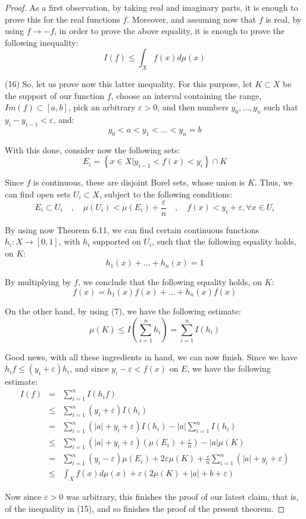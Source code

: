 \documentclass[10pt,a4paper]{amsart}
\begin{document}
\begin{proof}
As a first observation, by taking real and imaginary parts, it is enough to prove this for the real functions $f$. Moreover, and assuming now that $f$ is real, by using $f\to-f$, in order to prove the above equality, it is enough to prove the following inequality:
$$I(f)\leq\int_Xf(x)d\mu(x)$$

(16) So, let us prove now this latter inequality. For this purpose, let $K\subset X$ be the support of our function $f$, choose an interval containing the range, $Im(f)\subset[a,b]$, pick an arbitrary $\varepsilon>0$, and then numbers $y_0,\ldots,y_n$ such that $y_i-y_{i-1}<\varepsilon$, and:
$$y_0<a<y_1<\ldots<y_n=b$$

With this done, consider now the following sets:
$$E_i=\left\{x\in X\Big|y_{i-1}<f(x)<y_i\right\}\cap K$$

Since $f$ is continuous, these are disjoint Borel sets, whose union is $K$. Thus, we can find open sets $U_i\subset X$, subject to the following conditions:
$$E_i\subset U_i\quad,\quad \mu(U_i)<\mu(E_i)+\frac{\varepsilon}{n}\quad,\quad f(x)<y_i+\varepsilon,\forall x\in U_i$$

By using now Theorem 6.11, we can find certain continuous functions $h_i:X\to[0,1]$, with $h_i$ supported on $U_i$, such that the following equality holds, on $K$:
$$h_1(x)+\ldots+h_n(x)=1$$

By multiplying by $f$, we conclude that the following equality holds, on $K$:
$$f(x)=h_1(x)f(x)+\ldots+h_n(x)f(x)$$

On the other hand, by using (7), we have the following estimate:
$$\mu(K)\leq I\left(\sum_{i=1}^nh_i\right)=\sum_{i=1}^nI(h_i)$$

Good news, with all these ingredients in hand, we can now finish. Since we have $h_if\leq(y_i+\varepsilon)h_i$, and since $y_i-\varepsilon<f(x)$ on $E$, we have the following estimate:
\begin{eqnarray*}
I(f)
&=&\sum_{i=1}^nI(h_if)\\
&\leq&\sum_{i=1}^n(y_i+\varepsilon)I(h_i)\\
&=&\sum_{i=1}^n(|a|+y_i+\varepsilon)I(h_i)-|a|\sum_{i=1}^nI(h_i)\\
&\leq&\sum_{i=1}^n(|a|+y_i+\varepsilon)\left(\mu(E_i)+\frac{\varepsilon}{n}\right)-|a|\mu(K)\\
&=&\sum_{i=1}^n(y_i-\varepsilon)\mu(E_i)+2\varepsilon\mu(K)+\frac{\varepsilon}{n}\sum_{i=1}^n(|a|+y_i+\varepsilon)\\
&\leq&\int_Xf(x)d\mu(x)+\varepsilon\left(2\mu(K)+|a|+b+\varepsilon\right)
\end{eqnarray*}

Now since $\varepsilon>0$ was arbitrary, this finishes the proof of our latest claim, that is, of the inequality in (15), and so finishes the proof of the present theorem.
\end{proof}
\end{document}
